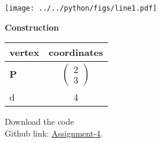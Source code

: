 \documentclass[10pt,a4paper]{report}
\newcommand{\myvec}[1]{\ensuremath{\begin{pmatrix}#1\end{pmatrix}}}
\let\vec\mathbf
\let\vec\mathbf
\begin{document}
\begin{multicols}{2}
\begin{center}
\texttt{[image: ../../python/figs/line1.pdf]} 
 \end{center}\vspace{1mm}
 
 \vspace{2mm} \textbf{Construction}
\begin{center}
\setlength{\arrayrulewidth}{0.5mm}
\setlength{\tabcolsep}{6pt}
\renewcommand{\arraystretch}{1.5}
    \begin{tabular}{|l|c|}
    \hline 
    \textbf{vertex} & \textbf{coordinates} \\ \hline
   $\vec{P}$ & $\myvec{
   2\\
   3
   } $ \\ \hline
   d&4\\ \hline
  
      \end{tabular}
  \end{center}
  
\raggedright  Download the code \\
Github link: \href{https://github.com/KrishnaYadati/Assignments/blob/main/Matrix-line_assignment/line_program/line1.py}{Assignment-4}.
  \end{multicols}
\end{document}
